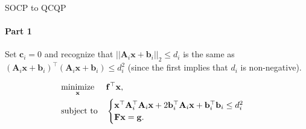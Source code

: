 \documentclass{beamer}
\begin{document}
\begin{frame}{SOCP to QCQP}
\framesubtitle{Part 1}
\begin{flushleft}

Set $\mathbf{c}_i = 0$ and recognize that $||\mathbf{A}_i\mathbf{x} + \mathbf{b}_i||_2 \leq d_i$ is the same as $(\mathbf{A}_i\mathbf{x} + \mathbf{b}_i)^\top (\mathbf{A}_i\mathbf{x} + \mathbf{b}_i) \leq d_i^2$ (since the first implies that $d_i$ is non-negative).

\bigskip
%
\begin{equation}
\begin{aligned}
& \underset{\mathbf{x}}{\text{minimize}}
& & \mathbf{f}^\top\mathbf{x}, \\
& \text{subject to}
& & \begin{cases}
    \mathbf{x}^\top \mathbf{A}_i^\top \mathbf{A}_i \mathbf{x} + 
    2 \mathbf{b}_i^\top \mathbf{A}_i\mathbf{x} + 
    \mathbf{b}_i^\top \mathbf{b}_i  \leq d_i^2\\
    \mathbf{F}\mathbf{x} = \mathbf{g}.
    \end{cases}
\end{aligned}
\end{equation}

\end{flushleft}
\end{frame}
\end{document}
